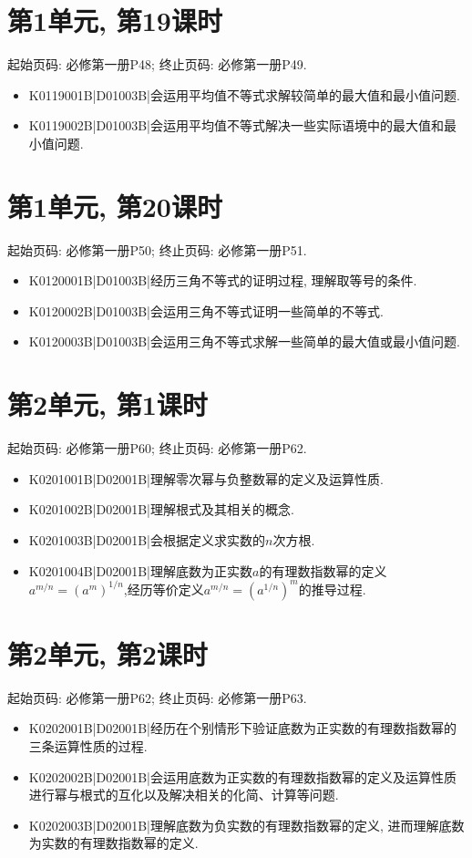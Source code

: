 \section*{第1单元, 第19课时}
起始页码: 必修第一册P48; 终止页码: 必修第一册P49.
\begin{itemize}
\item K0119001B|D01003B|会运用平均值不等式求解较简单的最大值和最小值问题.
\item K0119002B|D01003B|会运用平均值不等式解决一些实际语境中的最大值和最小值问题.
\end{itemize}

\section*{第1单元, 第20课时}
起始页码: 必修第一册P50; 终止页码: 必修第一册P51.
\begin{itemize}
\item K0120001B|D01003B|经历三角不等式的证明过程, 理解取等号的条件.
\item K0120002B|D01003B|会运用三角不等式证明一些简单的不等式.
\item K0120003B|D01003B|会运用三角不等式求解一些简单的最大值或最小值问题.
\end{itemize}

\section*{第2单元, 第1课时}
起始页码: 必修第一册P60; 终止页码: 必修第一册P62.
\begin{itemize}
\item K0201001B|D02001B|理解零次幂与负整数幂的定义及运算性质.
\item K0201002B|D02001B|理解根式及其相关的概念.
\item K0201003B|D02001B|会根据定义求实数的$n$次方根.
\item K0201004B|D02001B|理解底数为正实数$a$的有理数指数幂的定义$a^{m/n}=(a^{m})^{1/n}$,经历等价定义$a^{m/n}= (a^{1/n})^{m}$的推导过程.
\end{itemize}

\section*{第2单元, 第2课时}
起始页码: 必修第一册P62; 终止页码: 必修第一册P63.
\begin{itemize}
\item K0202001B|D02001B|经历在个别情形下验证底数为正实数的有理数指数幂的三条运算性质的过程.
\item K0202002B|D02001B|会运用底数为正实数的有理数指数幂的定义及运算性质进行幂与根式的互化以及解决相关的化简、计算等问题.
\item K0202003B|D02001B|理解底数为负实数的有理数指数幂的定义, 进而理解底数为实数的有理数指数幂的定义.
\end{itemize}


